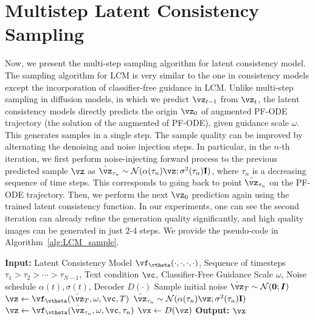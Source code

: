 \documentclass{article} %
\begin{document}
\section{Multistep Latent Consistency Sampling \label{appendix:sampling}}

Now, we present the multi-step sampling algorithm for latent consistency model. 
The sampling algorithm for LCM is very similar to the one in consistency models \citep{song2023consistency} except the incorporation of classifier-free guidance in LCM.
Unlike multi-step sampling in diffusion models, in which we predict $\vz_{t-1}$ from $\vz_{t}$, 
the latent consistency models directly predicts the origin $\vz_0$ of augmented PF-ODE trajectory (the solution of the augmented of PF-ODE), given guidance scale $\omega$. 
This generates samples in a single step.
The sample quality can be improved by alternating the denoising and noise injection steps. 
In particular, in the $n$-th iteration, we first perform noise-injecting forward process to the previous predicted sample $\vz$ as 
$\hat{\vz}_{\tau_n}\sim \mathcal{N}(\alpha(\tau_{n})\vz;\sigma^2(\tau_{n})\mathbf{I})$,
where $\tau_n$ is a decreasing sequence of time steps.
This corresponds to going back to point $\hat{\vz}_{\tau_n}$ on the PF-ODE trajectory. 
Then, we perform the next $\vz_0$ prediction again using the trained latent consistency function. 
In our experiments, one can see the second iteration can already refine the generation quality significantly, and high quality images can be generated in just 2-4 steps. 
We provide the pseudo-code in Algorithm~\ref{alg:LCM_sample}. 

\begin{algorithm}[H]
    \begin{minipage}{\linewidth}
        \caption{Multistep Latent Consistency Sampling}\label{alg:LCM_sample}
        \begin{algorithmic}
            \STATE \textbf{Input:} Latent Consistency Model $\vf_\vtheta(\cdot,\cdot,\cdot,\cdot)$, Sequence of timesteps $\tau_{1}>\tau_2>\cdots >\tau_{N-1}$, Text condition $\vc$, Classifier-Free Guidance Scale $\omega$, Noise schedule $\alpha(t),\sigma(t)$, Decoder $D(\cdot)$
            \STATE Sample initial noise $\hat{\vz}_T\sim \mathcal{N}(\bm{0};\bm{I})$
            \STATE $\vz\leftarrow \vf_\vtheta(\hat{\vz}_T,\omega, \vc, T)$
            \STATE $\hat{\vz}_{\tau_n}\sim \mathcal{N}(\alpha(\tau_{n})\vz;\sigma^2(\tau_{n})\mathbf{I})$
            \STATE $\vz\leftarrow \vf_\vtheta(\hat{\vz}_{\tau_n},\omega, \vc, \tau_n)$
            \ENDFOR
        \STATE $\vx\leftarrow D(\vz)$
        \STATE \textbf{Output:} $\vx$
        \end{algorithmic} 
    \end{minipage}
\end{algorithm}
\end{document}
